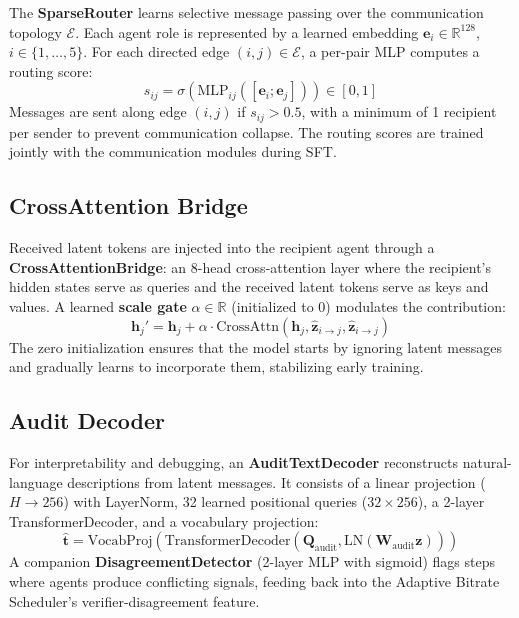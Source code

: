 \documentclass{article}
\newcommand{\RR}{\mathbb{R}}
\begin{document}
The \textbf{SparseRouter} learns selective message passing over the communication topology $\mathcal{E}$.  Each agent role is represented by a learned embedding $\mathbf{e}_i \in \RR^{128}$, $i \in \{1,\ldots,5\}$.  For each directed edge $(i,j) \in \mathcal{E}$, a per-pair MLP computes a routing score:
\begin{equation}
s_{ij} = \sigma(\text{MLP}_{ij}([\mathbf{e}_i; \mathbf{e}_j])) \in [0,1]
\label{eq:routing}
\end{equation}
Messages are sent along edge $(i,j)$ if $s_{ij} > 0.5$, with a minimum of 1 recipient per sender to prevent communication collapse.  The routing scores are trained jointly with the communication modules during SFT.

\subsection{CrossAttention Bridge}
\label{sec:bridge}

Received latent tokens are injected into the recipient agent through a \textbf{CrossAttentionBridge}: an 8-head cross-attention layer where the recipient's hidden states serve as queries and the received latent tokens serve as keys and values.  A learned \textbf{scale gate} $\alpha \in \RR$ (initialized to 0) modulates the contribution:
\begin{equation}
\mathbf{h}_j' = \mathbf{h}_j + \alpha \cdot \text{CrossAttn}(\mathbf{h}_j, \hat{\mathbf{z}}_{i \to j}, \hat{\mathbf{z}}_{i \to j})
\label{eq:bridge}
\end{equation}
The zero initialization ensures that the model starts by ignoring latent messages and gradually learns to incorporate them, stabilizing early training.

\subsection{Audit Decoder}
\label{sec:audit}

For interpretability and debugging, an \textbf{AuditTextDecoder} reconstructs natural-language descriptions from latent messages.  It consists of a linear projection ($H \to 256$) with LayerNorm, 32 learned positional queries ($32 \times 256$), a 2-layer TransformerDecoder, and a vocabulary projection:
\begin{equation}
\hat{\mathbf{t}} = \text{VocabProj}(\text{TransformerDecoder}(\mathbf{Q}_\text{audit}, \text{LN}(\mathbf{W}_\text{audit}\mathbf{z})))
\end{equation}
A companion \textbf{DisagreementDetector} (2-layer MLP with sigmoid) flags steps where agents produce conflicting signals, feeding back into the Adaptive Bitrate Scheduler's verifier-disagreement feature.
\end{document}
